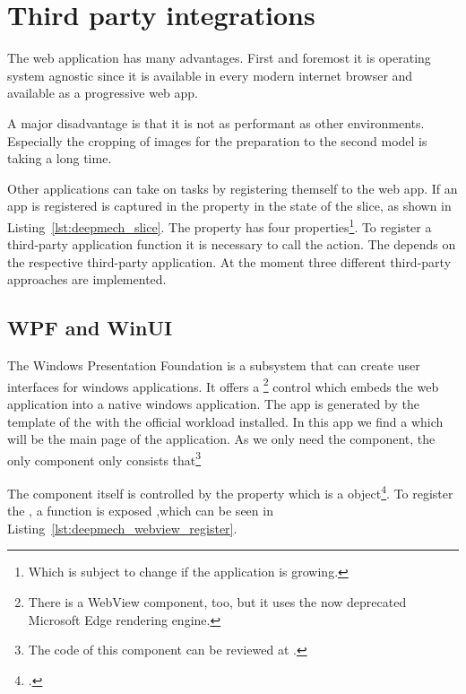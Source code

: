 \section{Third party integrations}

The web application has many advantages.
First and foremost it is operating system agnostic since it is available in every modern internet browser and available as a progressive web app. %

A major disadvantage is that it is not as performant as other environments.
Especially the cropping of images for the preparation to the second model is taking a long time.

Other applications can take on tasks by registering themself to the web app.
If an app is registered is captured in the  property in the state of the  slice, as shown in Listing~\ref{lst:deepmech_slice}.
The  property has four properties\footnote{Which is subject to change if the application is growing.}.
To register a third-party application function it is necessary to call the  action.
The  depends on the respective third-party application.
At the moment three different third-party approaches are implemented.

\subsection{WPF and WinUI}

The Windows Presentation Foundation is a subsystem that can create user interfaces for windows applications.
It offers a \footnote{There is a WebView component, too, but it uses the now deprecated Microsoft Edge rendering engine.} control which embeds the web application into a native windows application. %
The app is generated by the template  of the  with the official  workload installed.
In this app we find a  which will be the main page of the application.
As we only need the  component, the only component  only consists that\footnote{The code of this component can be reviewed at .}

The  component itself is controlled by the  property which is a  object\footnote{.}.
To register the , a  function is exposed ,which can be seen in Listing~\ref{lst:deepmech_webview_register}.

